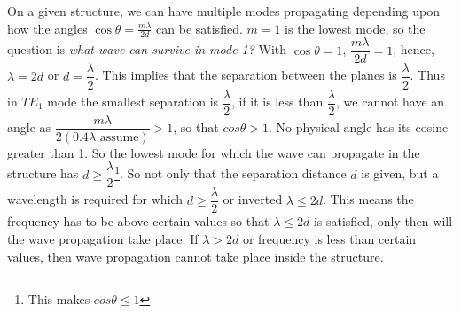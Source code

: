 On a given structure, we can have multiple modes propagating depending upon how the angles $\cos\theta = \frac{m\lambda}{2d}$ can be satisfied. $m=1$ is the lowest mode, so the question is \emph{what wave can survive in mode 1?} With $\cos\theta = 1$, $\dfrac{m\lambda}{2d} = 1$, hence, $\lambda = 2d$ or $d = \dfrac{\lambda}{2}$. This implies that the separation between the planes is $\dfrac{\lambda}{2}$. Thus in $TE_1$ mode the smallest separation is $\dfrac{\lambda}{2}$, if it is less than $\dfrac{\lambda}{2}$, we cannot have an angle as $\dfrac{m\lambda}{2(0.4\lambda \text{ assume})}> 1$, so that $cos\theta > 1$. No physical angle has its cosine greater than 1. So the lowest mode for which the wave can propagate in the structure has $d \geq \dfrac{\lambda}{2}$\footnote{
This makes $cos\theta \leq 1$
}. So not only that the separation distance $d$ is given, but a wavelength is required for which $d\geq\dfrac{\lambda}{2}$ or inverted $\lambda \leq 2d$. This means the frequency has to be above certain values so that $\lambda \leq 2d$ is satisfied, only then will the wave propagation take place. If $\lambda > 2d$ or frequency is less than certain values, then wave propagation cannot take place inside the structure.
